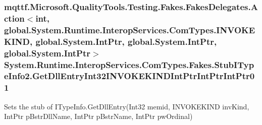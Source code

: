 \hypertarget{class_system_1_1_runtime_1_1_interop_services_1_1_com_types_1_1_fakes_1_1_stub_i_type_info2_a6188ec808457f57bda5911589894d99f}{
\subsubsection[{Get\-Dll\-Entry\-Int32\-I\-N\-V\-O\-K\-E\-K\-I\-N\-D\-Int\-Ptr\-Int\-Ptr\-Int\-Ptr01}]{\setlength{\rightskip}{0pt plus 5cm}mqttf.\-Microsoft.\-Quality\-Tools.\-Testing.\-Fakes.\-Fakes\-Delegates.\-Action$<$int, global.\-System.\-Runtime.\-Interop\-Services.\-Com\-Types.\-I\-N\-V\-O\-K\-E\-K\-I\-N\-D, global.\-System.\-Int\-Ptr, global.\-System.\-Int\-Ptr, global.\-System.\-Int\-Ptr$>$ System.\-Runtime.\-Interop\-Services.\-Com\-Types.\-Fakes.\-Stub\-I\-Type\-Info2.\-Get\-Dll\-Entry\-Int32\-I\-N\-V\-O\-K\-E\-K\-I\-N\-D\-Int\-Ptr\-Int\-Ptr\-Int\-Ptr01}}\label{class_system_1_1_runtime_1_1_interop_services_1_1_com_types_1_1_fakes_1_1_stub_i_type_info2_a6188ec808457f57bda5911589894d99f}


Sets the stub of I\-Type\-Info.\-Get\-Dll\-Entry(\-Int32 memid, I\-N\-V\-O\-K\-E\-K\-I\-N\-D inv\-Kind, Int\-Ptr p\-Bstr\-Dll\-Name, Int\-Ptr p\-Bstr\-Name, Int\-Ptr pw\-Ordinal)

